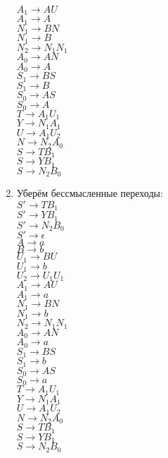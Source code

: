 \documentclass{article}
\begin{document}
\begin{enumerate}
    $ A_1 \to AU$\\
    $ A_1 \to A$\\
    $ N_1 \to BN$\\
    $ N_1 \to B$\\
    $ N_2 \to N_1N_1$\\
    $ A_0 \to AN$\\
    $ A_0 \to A$\\
    $ S_1 \to BS$\\
    $ S_1 \to B$\\
    $ S_0 \to AS$\\
    $ S_0 \to A$\\
    $ T \to A_1U_1$\\
    $ Y \to N_1A_1$\\
    $ U \to A_1U_2 $\\
    $ N \to N_2A_0 $\\
    $ S \to TB_1 $\\
    $ S \to YB_1 $\\
    $ S \to N_2B_0 $\\
    \item Уберём бессмысленные переходы:\\
    $ S' \to TB_1 $\\
    $ S' \to YB_1 $\\
    $ S' \to N_2B_0 $\\
    $ S' \to \epsilon$\\
    $ A \to a $\\
    $ B \to b $\\
    $ U_1 \to BU$\\
    $ U_1 \to b$\\
    $ U_2 \to U_1U_1 $\\
    $ A_1 \to AU$\\
    $ A_1 \to a$\\
    $ N_1 \to BN$\\
    $ N_1 \to b$\\
    $ N_2 \to N_1N_1$\\
    $ A_0 \to AN$\\
    $ A_0 \to a$\\
    $ S_1 \to BS$\\
    $ S_1 \to b$\\
    $ S_0 \to AS$\\
    $ S_0 \to a$\\
    $ T \to A_1U_1$\\
    $ Y \to N_1A_1$\\
    $ U \to A_1U_2 $\\
    $ N \to N_2A_0 $\\
    $ S \to TB_1 $\\
    $ S \to YB_1 $\\
    $ S \to N_2B_0 $\\
    \end{enumerate}
    
\end{document}
